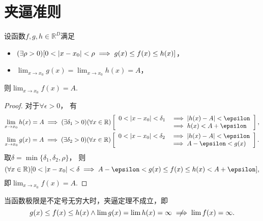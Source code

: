 \section{夹逼准则}
\begin{theorem}\label{theorem:函数极限.夹逼准则}
设函数\(f,g,h\in\mathbb{R}^D\)满足\begin{itemize}
	\item \((\exists\rho>0)
	[0<\abs{x-x_0}<\rho \implies g(x) \leq f(x) \leq h(x)]\)，
	\item \(\lim_{x \to x_0} g(x) = \lim_{x \to x_0} h(x) = A\)，
\end{itemize}
则\(\lim_{x \to x_0} f(x) = A\).
\begin{proof}
对于\(\forall\epsilon>0\)，
有\begin{gather*}
	\lim_{x \to x_0} h(x) = A
	\implies
	(\exists\delta_1>0)
	(\forall x\in\mathbb{R})
	\left[
		\begin{array}{rl}
			0<\abs{x-x_0}<\delta_1
			&\implies
			\abs{h(x)-A}<\epsilon \\
			&\implies
			h(x)<A+\epsilon
		\end{array}
	\right], \\
	\lim_{x \to x_0} g(x) = A
	\implies
	(\exists\delta_2>0)
	(\forall x\in\mathbb{R})
	\left[
		\begin{array}{rl}
			0<\abs{x-x_0}<\delta_2
			&\implies
			\abs{h(x)-A}<\epsilon \\
			&\implies
			A-\epsilon<g(x)
		\end{array}
	\right].
\end{gather*}
取\(\delta=\min\{\delta_1,\delta_2,\rho\}\)，
则\[
	(\forall x\in\mathbb{R})
	[
		0<\abs{x-x_0}<\delta
		\implies
		A-\epsilon < g(x) \leq f(x) \leq h(x) < A+\epsilon
	],
\]
即\(\lim_{x \to x_0} f(x) = A\).
\end{proof}
\end{theorem}

\begin{remark}
当函数极限是不定号无穷大时，夹逼定理不成立，即\[
	g(x) \leq f(x) \leq h(x)
	\land
	\lim g(x) = \lim h(x) = \infty
	\notimplies
	\lim f(x) = \infty.
\]
\end{remark}

